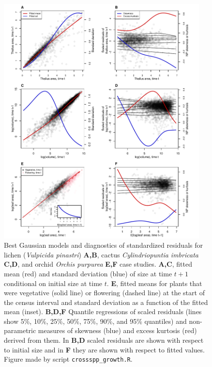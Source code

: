 \documentclass[12pt]{article}
\begin{document}
\begin{figure}[tbp]
	\centering
	\includegraphics[width=0.95\textwidth]{figures/combo_resid_diagnostics.pdf}
	\caption{Best Gaussian models and diagnostics of standardized residuals for lichen (\emph{Vulpicida pinastri}) \textbf{A,B}, cactus \emph{Cylindriopuntia imbricata} \textbf{C,D}, and orchid \emph{Orchis purpurea} \textbf{E,F} case studies. \textbf{A,C}, fitted mean (red) and standard deviation (blue) of size at time $t+1$ conditional on initial size at time $t$. \textbf{E}, fitted means for plants that were vegetative (solid line) or flowering (dashed line) at the start of the census interval and standard deviation as a function of the fitted mean (inset). \textbf{B,D,F} Quantile regressions of scaled residuals (lines show 5\%, 10\%, 25\%, 50\%, 75\%, 90\%, and 95\% quantiles) and non-parametric measures of skewness (blue) and excess kurtosis (red) derived from them. In \textbf{B,D} scaled residuals are shown with respect to initial size and in \textbf{F} they are shown with respect to fitted values. Figure made by script \texttt{crossspp\_growth.R}.}
	\label{fig:resid_diagnostics}
\end{figure}
\end{document}
